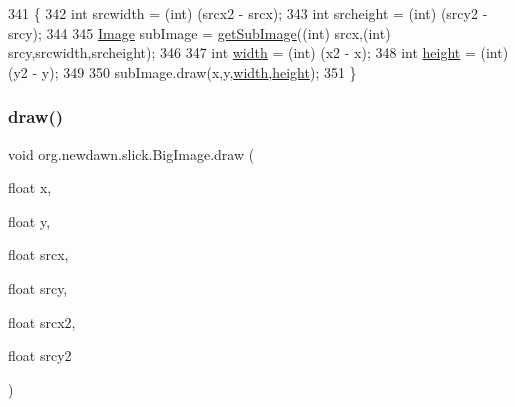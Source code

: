 \begin{DoxyCode}
341                                                                                                            
        \{
342         \textcolor{keywordtype}{int} srcwidth = (int) (srcx2 - srcx);
343         \textcolor{keywordtype}{int} srcheight = (int) (srcy2 - srcy);
344 
345         \mbox{\hyperlink{classorg_1_1newdawn_1_1slick_1_1_image_a2c047fa669a8387f6c2d9bde33b3ee04}{Image}} subImage = \mbox{\hyperlink{classorg_1_1newdawn_1_1slick_1_1_big_image_a9384aa6b99cc0b45947a5b66bf2ab19c}{getSubImage}}((\textcolor{keywordtype}{int}) srcx,(\textcolor{keywordtype}{int}) srcy,srcwidth,srcheight);
346 
347         \textcolor{keywordtype}{int} \mbox{\hyperlink{classorg_1_1newdawn_1_1slick_1_1_image_a7d02c85e21b388428cfe5cc5c82714a1}{width}} = (int) (x2 - x);
348         \textcolor{keywordtype}{int} \mbox{\hyperlink{classorg_1_1newdawn_1_1slick_1_1_image_a54397a37823bc59ddc79ec70dc5cf226}{height}} = (int) (y2 - y);
349 
350         subImage.draw(x,y,\mbox{\hyperlink{classorg_1_1newdawn_1_1slick_1_1_image_a7d02c85e21b388428cfe5cc5c82714a1}{width}},\mbox{\hyperlink{classorg_1_1newdawn_1_1slick_1_1_image_a54397a37823bc59ddc79ec70dc5cf226}{height}});
351     \}
\end{DoxyCode}
\mbox{\label{classorg_1_1newdawn_1_1slick_1_1_big_image_a0dabada05695125d9e42a4e4b475e1c3}} 
\subsubsection{\texorpdfstring{draw()}{draw()}\hspace{0.1cm}{\footnotesize\ttfamily [6/10]}}
{\footnotesize\ttfamily void org.\+newdawn.\+slick.\+Big\+Image.\+draw (\begin{DoxyParamCaption}\item[{float}]{x,  }\item[{float}]{y,  }\item[{float}]{srcx,  }\item[{float}]{srcy,  }\item[{float}]{srcx2,  }\item[{float}]{srcy2 }\end{DoxyParamCaption})\hspace{0.3cm}{\ttfamily [inline]}}

